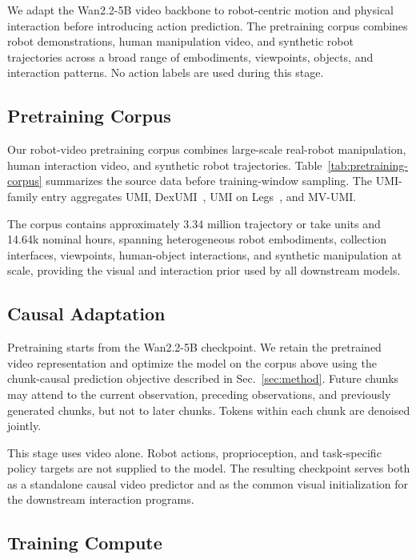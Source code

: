 We adapt the Wan2.2-5B video backbone to robot-centric motion and physical
interaction before introducing action prediction. The pretraining corpus
combines robot demonstrations, human manipulation video, and synthetic robot
trajectories across a broad range of embodiments, viewpoints, objects, and
interaction patterns. No action labels are used during this stage.

\subsection{Pretraining Corpus}
\label{app:pretraining-data}

Our robot-video pretraining corpus combines large-scale real-robot manipulation,
human interaction video, and synthetic robot trajectories. Table~\ref{tab:pretraining-corpus}
summarizes the source data before training-window sampling. The UMI-family entry
aggregates UMI, DexUMI~\cite{xu2025dexumi}, UMI on Legs~\cite{ha2024umilegs}, and MV-UMI.

The corpus contains approximately 3.34 million trajectory or take units and
14.64k nominal hours, spanning heterogeneous robot embodiments, collection
interfaces, viewpoints, human-object interactions, and synthetic manipulation
at scale, providing the visual and interaction prior used by all downstream
\ours models.


\subsection{Causal Adaptation}
\label{app:pretraining-causal}

Pretraining starts from the Wan2.2-5B checkpoint. We retain the pretrained
video representation and optimize the model on the corpus above using the
chunk-causal prediction objective described in Sec.~\ref{sec:method}. Future
chunks may attend to the current observation, preceding observations, and
previously generated chunks, but not to later chunks. Tokens within each
chunk are denoised jointly.

This stage uses video alone. Robot actions, proprioception, and task-specific
policy targets are not supplied to the model. The resulting checkpoint serves
both as a standalone causal video predictor and as the common visual
initialization for the downstream \ours interaction programs.

\subsection{Training Compute}
\label{app:pretraining-compute}

